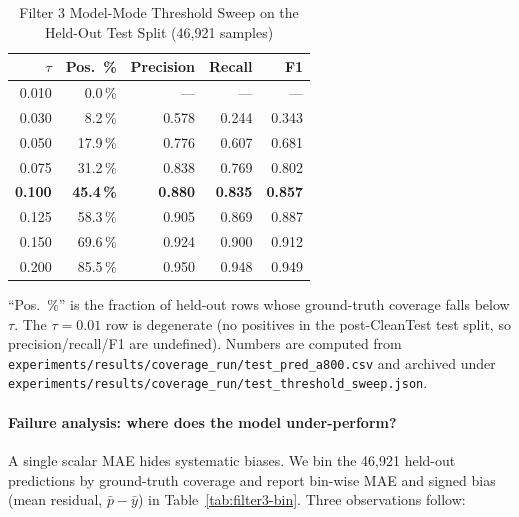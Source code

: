 \documentclass[acmlarge,nonacm,screen]{acmart}
\begin{document}
\begin{table}[htbp]
\caption{Filter 3 Model-Mode Threshold Sweep on the Held-Out Test Split (46{,}921 samples)}
\label{tab:filter3-classif-sweep}
\begin{tabular}{@{}rrrrr@{}}
\toprule
\textbf{$\tau$} & \textbf{Pos.\ \%} & \textbf{Precision} & \textbf{Recall} & \textbf{F1} \\
\midrule
0.010 & 0.0\,\% & --- & --- & --- \\
0.030 & 8.2\,\% & 0.578 & 0.244 & 0.343 \\
0.050 & 17.9\,\% & 0.776 & 0.607 & 0.681 \\
0.075 & 31.2\,\% & 0.838 & 0.769 & 0.802 \\
\textbf{0.100} & \textbf{45.4\,\%} & \textbf{0.880} & \textbf{0.835} & \textbf{0.857} \\
0.125 & 58.3\,\% & 0.905 & 0.869 & 0.887 \\
0.150 & 69.6\,\% & 0.924 & 0.900 & 0.912 \\
0.200 & 85.5\,\% & 0.950 & 0.948 & 0.949 \\
\bottomrule
\end{tabular}
\begin{flushleft}
\small ``Pos.\ \%'' is the fraction of held-out rows whose
ground-truth coverage falls below $\tau$. The $\tau = 0.01$ row
is degenerate (no positives in the post-CleanTest test split, so
precision/recall/F1 are undefined). Numbers are computed from
\texttt{experiments/\allowbreak results/\allowbreak coverage\_run/\allowbreak test\_pred\_a800.csv}
and archived under
\texttt{experiments/\allowbreak results/\allowbreak coverage\_run/\allowbreak test\_threshold\_sweep.json}.
\end{flushleft}
\end{table}

\paragraph{Failure analysis: where does the model under-perform?}
A single scalar MAE hides systematic biases. We bin the 46{,}921
held-out predictions by ground-truth coverage and report bin-wise
MAE and signed bias (mean residual,
$\bar{p} - \bar{y}$) in Table~\ref{tab:filter3-bin}. Three
observations follow:
\end{document}
